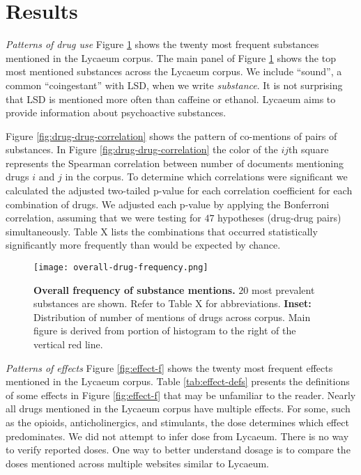 \documentclass{article}
\begin{document}
 
\section*{Results}

\emph{Patterns of drug use}
  Figure \ref{fig:overall-f} shows the twenty most frequent substances mentioned in the Lycaeum corpus. The main panel of Figure \ref{fig:overall-f} shows the top  most mentioned substances across the Lycaeum corpus. We include ``sound'',  a common ``coingestant'' with LSD, when we write \emph{substance}.  It is not surprising that LSD is mentioned more often than caffeine or ethanol. Lycaeum aims to provide information about psychoactive substances. 
  
  Figure \ref{fig:drug-drug-correlation} shows the pattern of co-mentions of pairs of substances. In Figure \ref{fig:drug-drug-correlation} the color of the $ij$th square represents the Spearman correlation between number of documents mentioning drugs $i$ and $j$ in the corpus. To determine which correlations were significant we calculated the adjusted two-tailed p-value for each correlation coefficient for each combination of drugs. We adjusted each p-value by applying the Bonferroni correlation, assuming that we were testing for $47$ hypotheses (drug-drug pairs) simultaneously. Table X lists the combinations that occurred statistically significantly more frequently than would be expected by chance. 
  
  \begin{figure}[h]
\centering
\texttt{[image: overall-drug-frequency.png]}
\caption{\textbf{Overall frequency of substance mentions.} $20$ most prevalent substances are shown. Refer to Table X for abbreviations. \textbf{Inset:} Distribution of number of mentions of drugs across corpus. Main figure is derived from portion of histogram to the right of the vertical red line.}
\label{fig:overall-f}
\end{figure}
  
\emph{Patterns of effects}
  Figure \ref{fig:effect-f} shows the twenty most frequent effects mentioned in the Lycaeum corpus. Table \ref{tab:effect-defs} presents the definitions of some effects in Figure \ref{fig:effect-f} that may be unfamiliar to the reader. Nearly all drugs mentioned in the Lycaeum corpus have multiple effects. For some, such as the opioids, anticholinergics, and stimulants, the dose determines which effect predominates. We did not attempt to infer dose from Lycaeum. There is no way to verify reported doses. One way to better understand dosage is to compare the doses mentioned across multiple websites similar to Lycaeum. 
\end{document}
